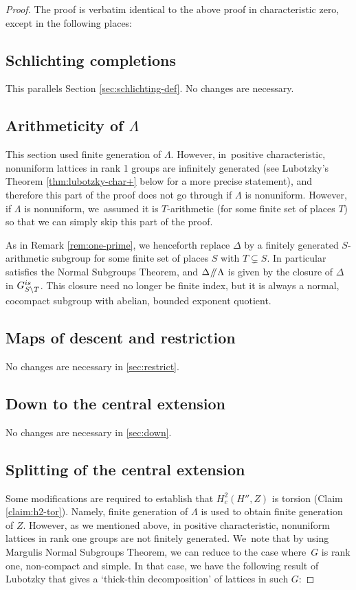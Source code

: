 \documentclass[11pt]{article}
\numberwithin{equation}{section}\providecommand{\llangle}{\langle\!\langle}\providecommand{\rrangle}{\rangle\!\rangle}\providecommand{\Asterisk}{\ast}
\let\bs\backslash
\newcommand{\sslash}{\mathbin{\mkern-3mu /\mkern-5mu/ \mkern-3mu}}
\theoremstyle{definition}
\begin{document}
\begin{proof} The proof is verbatim identical to the above proof in characteristic zero, except in the following places:

\subsection{Schlichting completions} This parallels Section \ref{sec:schlichting-def}. No changes are necessary.

\subsection{Arithmeticity of $\Lambda$} \label{sec:arithm-char+}
This section used finite generation of $\Lambda$. However, in~positive characteristic, nonuniform lattices in rank 1 groups are infinitely generated (see Lubotzky's Theorem \ref{thm:lubotzky-char+} below for a more precise statement), and therefore this part of the proof does not go through if $\Lambda$ is nonuniform. However, if $\Lambda$ is nonuniform, we~assumed it is $T$-arithmetic (for some finite set of places $T$) so that we can simply skip this part of the proof.

As in Remark \ref{rem:one-prime}, we henceforth replace $\Delta$ by a finitely generated $S$-arithmetic subgroup for some finite set of places $S$ with $T\subsetneq S$. In particular satisfies the Normal Subgroups Theorem, and $\Delta\sslash\Lambda$ is given by the closure of $\Delta$ in $G_{S\bs T}^{\textup{is}}$. This closure need no longer be finite index, but it is always a normal, cocompact subgroup with abelian, bounded exponent quotient.

\subsection{Maps of descent and restriction} No changes are necessary in \ref{sec:restrict}.

\subsection{Down to the central extension} No changes are necessary in \ref{sec:down}.

\subsection{Splitting of the central extension} Some modifications are required to establish that $H^2_c(H'',Z)$ is torsion (Claim \ref{claim:h2-tor}). Namely, finite generation of $\Lambda$ is used to obtain finite generation of $Z$. However, as we mentioned above, in positive characteristic, nonuniform lattices in rank one groups are not finitely generated. We~note that by using Margulis Normal Subgroups Theorem, we can reduce to the case where~$G$ is rank one, non-compact and simple. In that case, we have the following result of Lubotzky that gives a `thick-thin decomposition' of lattices in such $G$:


\end{proof}
\end{document}
